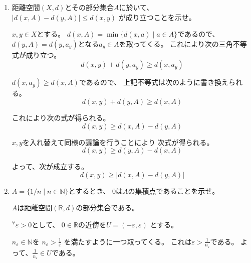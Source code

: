 \documentclass[12pt,b5paper]{ltjsarticle}
\begin{document}
\begin{enumerate}
 \item
      距離空間$(X,d)$とその部分集合$A$に於いて、
      $\lvert d(x,A) - d(y,A) \rvert \leq d(x,y)$
      が成り立つことを示せ。

\dotfill


      $x,y\in X$とする。
      $d(x,A) = \min \{ d(x,a) \mid a\in A\}$であるので、
      $d(y,A)=d(y,a_y)$となる$a_y\in A$を取ってくる。
      これにより次の三角不等式が成り立つ。
      \begin{equation}
       d(x,y)+d(y,a_y) \geq d(x,a_y)
      \end{equation}

      $d(x,a_y)\geq d(x,A)$であるので、
      上記不等式は次のように書き換えられる。
      \begin{equation}
       d(x,y)+d(y,A) \geq d(x,A)
      \end{equation}

      これにより次の式が得られる。
      \begin{equation}
       d(x,y) \geq d(x,A) - d(y,A)
      \end{equation}

      $x,y$を入れ替えて同様の議論を行うことにより
      次式が得られる。
      \begin{equation}
       d(x,y) \geq d(y,A) - d(x,A)
      \end{equation}

      よって、次が成立する。
      \begin{equation}
       d(x,y) \geq \lvert d(x,A) - d(y,A) \rvert
      \end{equation}

\hrulefill
 \item
      $A=\{1/n \mid n\in\mathbb{N} \}$とするとき、
      $0$は$A$の集積点であることを示せ。

\dotfill

      $A$は距離空間$(\mathbb{R},d)$の部分集合である。

      ${}^{\forall}\varepsilon>0$として、
      $0\in \mathbb{R}$の近傍を$U=(-\varepsilon,\varepsilon)$
      とする。

      $n_\varepsilon \in \mathbb{N}$を
      $n_\varepsilon > \frac{1}{\varepsilon}$
      を満たすように一つ取ってくる。
      これは$\varepsilon > \frac{1}{n_\varepsilon}$である。
      よって、$\frac{1}{n_\varepsilon}\in U$である。


\end{enumerate}
\end{document}
